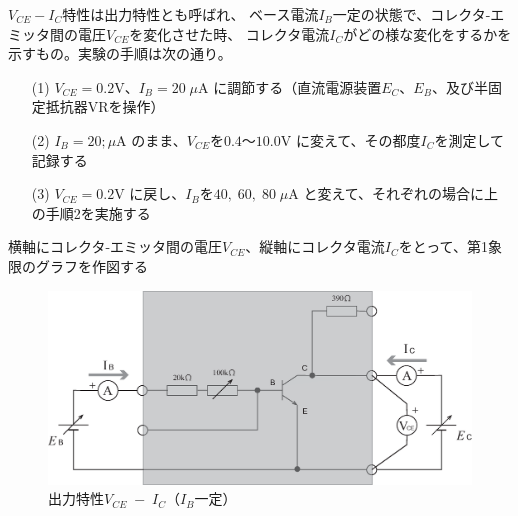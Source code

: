 \documentclass[uplatex,a4paper,11pt,oneside,openany]{jsbook}
\begin{document}
$V_{CE}-I_C$特性は出力特性とも呼ばれ、
ベース電流$I_B$一定の状態で、コレクタ-エミッタ間の電圧$V_{CE}$を変化させた時、
コレクタ電流$I_C$がどの様な変化をするかを示すもの。実験の手順は次の通り。
\begin{enumerate}
	\item[(1)] $V_{CE}=0.2$V、$I_B=20\;\mu$A に調節する（直流電源装置$E_C$、$E_B$、及び半固定抵抗器VRを操作）
	\item[(2)] $I_B=20;\mu$A のまま、$V_{CE}$を$0.4$〜$10.0$V に変えて、その都度$I_C$を測定して記録する
	\item[(3)] $V_{CE}=0.2$V に戻し、$I_B$を$40,\;60,\;80\;\mu$A と変えて、それぞれの場合に上の手順2を実施する    
\end{enumerate}
横軸にコレクタ-エミッタ間の電圧$V_{CE}$、縦軸にコレクタ電流$I_C$をとって、第1象限のグラフを作図する

\vfill

\begin{figure}[H]
	\centering
	\includegraphics[keepaspectratio, scale=0.45, angle=0]
	{figs/eps/ex1.eps}
	\caption{出力特性$V_{CE}\;-\;I_C$（$I_B$一定）}
	\label{fig:ex1}
\end{figure}

\vfill
\end{document}
